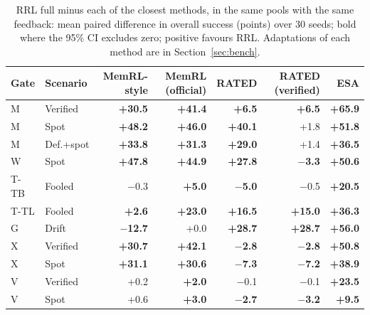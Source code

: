 \begin{table}[t]
\centering
\small
\setlength{\tabcolsep}{4pt}
\begin{tabular}{llrrrrr}
\toprule
Gate & Scenario & MemRL-style & MemRL (official) & RATED & RATED (verified) & ESA \\
\midrule
M & Verified & \textbf{+30.5} & \textbf{+41.4} & \textbf{+6.5} & \textbf{+6.5} & \textbf{+65.9} \\
M & Spot & \textbf{+48.2} & \textbf{+46.0} & \textbf{+40.1} & +1.8 & \textbf{+51.8} \\
M & Def.+spot & \textbf{+33.8} & \textbf{+31.3} & \textbf{+29.0} & +1.4 & \textbf{+36.5} \\
W & Spot & \textbf{+47.8} & \textbf{+44.9} & \textbf{+27.8} & \textbf{$-$3.3} & \textbf{+50.6} \\
T-TB & Fooled & $-$0.3 & \textbf{+5.0} & \textbf{$-$5.0} & $-$0.5 & \textbf{+20.5} \\
T-TL & Fooled & \textbf{+2.6} & \textbf{+23.0} & \textbf{+16.5} & \textbf{+15.0} & \textbf{+36.3} \\
G & Drift & \textbf{$-$12.7} & +0.0 & \textbf{+28.7} & \textbf{+28.7} & \textbf{+56.0} \\
X & Verified & \textbf{+30.7} & \textbf{+42.1} & \textbf{$-$2.8} & \textbf{$-$2.8} & \textbf{+50.8} \\
X & Spot & \textbf{+31.1} & \textbf{+30.6} & \textbf{$-$7.3} & \textbf{$-$7.2} & \textbf{+38.9} \\
V & Verified & +0.2 & \textbf{+2.0} & $-$0.1 & $-$0.1 & \textbf{+23.5} \\
V & Spot & +0.6 & \textbf{+3.0} & \textbf{$-$2.7} & \textbf{$-$3.2} & \textbf{+9.5} \\
\bottomrule
\end{tabular}
\caption{RRL full minus each of the closest methods, in the same pools with the same feedback: mean paired difference in overall success (points) over 30 seeds; bold where the 95\% CI excludes zero; positive favours RRL. Adaptations of each method are in Section~\ref{sec:bench}.}
\label{tab:external}
\end{table}

